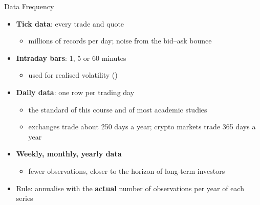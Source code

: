 \begin{frame}{Data Frequency}
\itemsize{\small}
\begin{itemize}
    \item \textbf{Tick data}: every trade and quote
    \begin{itemize}
        \item millions of records per day; noise from the bid--ask bounce
    \end{itemize}
    \item \textbf{Intraday bars}: 1, 5 or 60 minutes
    \begin{itemize}
        \item used for realised volatility ()
    \end{itemize}
    \item \textbf{Daily data}: one row per trading day
    \begin{itemize}
        \item the standard of this course and of most academic studies
        \item exchanges trade about 250 days a year; crypto markets trade 365 days a year
    \end{itemize}
    \item \textbf{Weekly, monthly, yearly data}
    \begin{itemize}
        \item fewer observations, closer to the horizon of long-term investors
    \end{itemize}
    \item Rule: annualise with the \textbf{actual} number of observations per year of each series
\end{itemize}
\end{frame}

